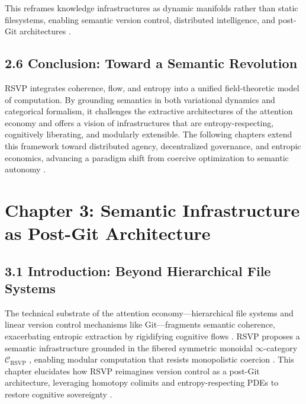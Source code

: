 \documentclass[12pt]{article}
\begin{document}
This reframes knowledge infrastructures as dynamic manifolds rather than static 
filesystems, enabling semantic version control, distributed intelligence, and 
post-Git architectures \citep{whitehead1978}.

\subsection*{2.6 Conclusion: Toward a Semantic Revolution}

RSVP integrates coherence, flow, and entropy into a unified field-theoretic model of 
computation. By grounding semantics in both variational dynamics and categorical 
formalism, it challenges the extractive architectures of the attention economy and 
offers a vision of infrastructures that are entropy-respecting, cognitively liberating, 
and modularly extensible. The following chapters extend this framework toward 
distributed agency, decentralized governance, and entropic economics, advancing a 
paradigm shift from coercive optimization to semantic autonomy 
\citep{deleuze1987, milewski2018}.

\section*{Chapter 3: Semantic Infrastructure as Post-Git Architecture}
\subsection*{3.1 Introduction: Beyond Hierarchical File Systems}
The technical substrate of the attention economy---hierarchical file systems and linear version control mechanisms like Git---fragments semantic coherence, exacerbating entropic extraction by rigidifying cognitive flows \citep{lanier2018, bird1988}. RSVP proposes a semantic infrastructure grounded in the fibered symmetric monoidal \(\infty\)-category \(\mathcal{C}_{\text{RSVP}}\) \citep{maclane1998}, enabling modular computation that resists monopolistic coercion \citep{zuboff2019}. This chapter elucidates how RSVP reimagines version control as a post-Git architecture, leveraging homotopy colimits and entropy-respecting PDEs to restore cognitive sovereignty \citep{ortega1957}.
\end{document}
